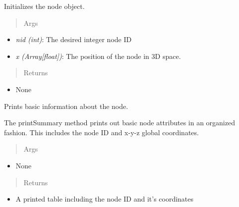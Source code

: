 \documentclass[letterpaper,10pt,english]{sphinxmanual}
\begin{document}
\begin{fulllineitems}
\begin{fulllineitems}
\label{structures:AeroComBAT.Structures.Node.__init__}
Initializes the node object.
\begin{quote}\begin{description}
\item[{Args}] \leavevmode
\end{description}\end{quote}
\begin{itemize}
\item {} 
\emph{nid (int)}: The desired integer node ID

\item {} 
\emph{x (Array{[}float{]})}: The position of the node in 3D space.

\end{itemize}
\begin{quote}\begin{description}
\item[{Returns}] \leavevmode
\end{description}\end{quote}
\begin{itemize}
\item {} 
None

\end{itemize}

\end{fulllineitems}


\begin{fulllineitems}
\label{structures:AeroComBAT.Structures.Node.printSummary}
Prints basic information about the node.

The printSummary method prints out basic node attributes in an organized
fashion. This includes the node ID and x-y-z global coordinates.
\begin{quote}\begin{description}
\item[{Args}] \leavevmode
\end{description}\end{quote}
\begin{itemize}
\item {} 
None

\end{itemize}
\begin{quote}\begin{description}
\item[{Returns}] \leavevmode
\end{description}\end{quote}
\begin{itemize}
\item {} 
A printed table including the node ID and it's coordinates

\end{itemize}

\end{fulllineitems}


\end{fulllineitems}
\end{document}
